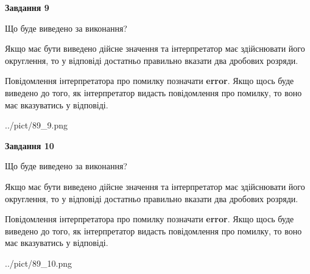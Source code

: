 \documentclass[12pt, ukrainian]{article}
\begin{document}
{\begin {Large}
{\begin {center}\textbf{Завдання 9}\end {center}}\par
Що буде виведено за виконання? \par

Якщо має бути виведено дійсне значення та інтерпретатор має здійснювати його округлення, 
то у відповіді достатньо правильно вказати два дробових розряди.

Повідомлення інтерпретатора про помилку позначати \textbf{error}.
Якщо щось буде виведено до того, як інтерпретатор видасть повідомлення про помилку, 
то воно має вказуватись у відповіді. \par

\begin{center}
	{../pict/89_9.png}
\end{center}
\newpage

{\begin {center}\textbf{Завдання 10}\end {center}}\par
Що буде виведено за виконання? \par

Якщо має бути виведено дійсне значення та інтерпретатор має здійснювати його округлення, 
то у відповіді достатньо правильно вказати два дробових розряди.

Повідомлення інтерпретатора про помилку позначати \textbf{error}.
Якщо щось буде виведено до того, як інтерпретатор видасть повідомлення про помилку, 
то воно має вказуватись у відповіді. \par

\begin{center}
	{../pict/89_10.png}
\end{center}
\newpage

\end {Large}}
\end{document}
